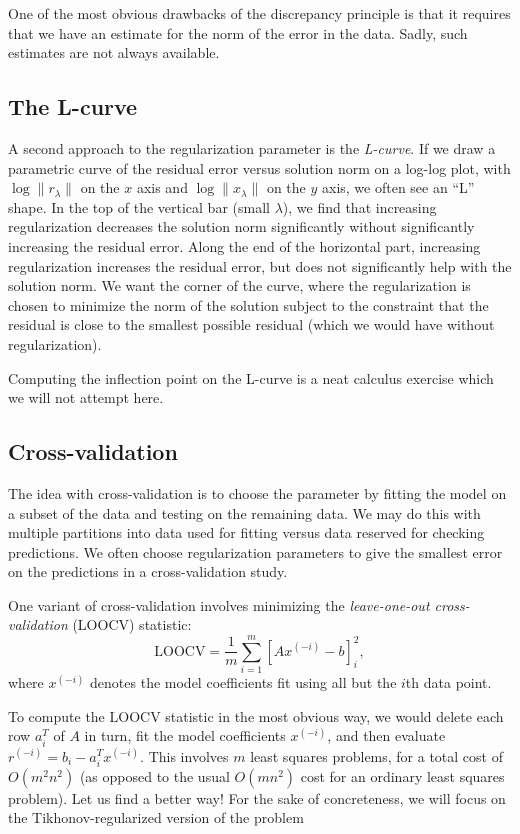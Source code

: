 \documentclass[12pt, leqno]{article} %
\begin{document}
One of the most obvious drawbacks of the discrepancy principle is that
it requires that we have an estimate for the norm of the error in the
data.  Sadly, such estimates are not always available.

\subsection{The L-curve}

A second approach to the regularization parameter is the {\em L-curve}.
If we draw a parametric curve of the residual error versus solution norm
on a log-log plot, with $\log \|r_{\lambda}\|$ on the $x$ axis
and $\log \|x_{\lambda}\|$ on the $y$ axis, we often see an ``L'' shape.
In the top of the vertical bar (small $\lambda$), we find that increasing
regularization decreases the solution norm significantly without significantly
increasing the residual error.  Along the end of the horizontal part,
increasing regularization increases the residual error, but does not
significantly help with the solution norm.  We want the corner of the
curve, where the regularization is chosen to minimize the norm of the
solution subject to the constraint that the residual is close to the
smallest possible residual (which we would have without regularization).

Computing the inflection point on the L-curve is a neat calculus
exercise which we will not attempt here.

\subsection{Cross-validation}

The idea with cross-validation is to choose the parameter
by fitting the model on a subset of the data and testing on the remaining
data.  We may do this with multiple partitions into data used for fitting
versus data reserved for checking predictions.
We often choose regularization parameters to give the smallest error on
the predictions in a cross-validation study.

One variant of cross-validation involves minimizing the
{\em leave-one-out cross-validation} (LOOCV) statistic:
\[
  \mbox{LOOCV} = \frac{1}{m} \sum_{i=1}^m \left[ Ax^{(-i)}-b \right]_i^2,
\]
where $x^{(-i)}$ denotes the model coefficients fit using all but the
$i$th data point.

To compute the LOOCV statistic in the most obvious way, we would
delete each row $a_i^T$ of $A$ in turn, fit the model coefficients
$x^{(-i)}$, and then evaluate $r^{(-i)} = b_i - a_i^T x^{(-i)}$.
This involves $m$
least squares problems, for a total cost of $O(m^2 n^2)$ (as opposed
to the usual $O(mn^2)$ cost for an ordinary least squares problem).
Let us find a better way!  For the sake of concreteness, we will focus
on the Tikhonov-regularized version of the problem
\end{document}
